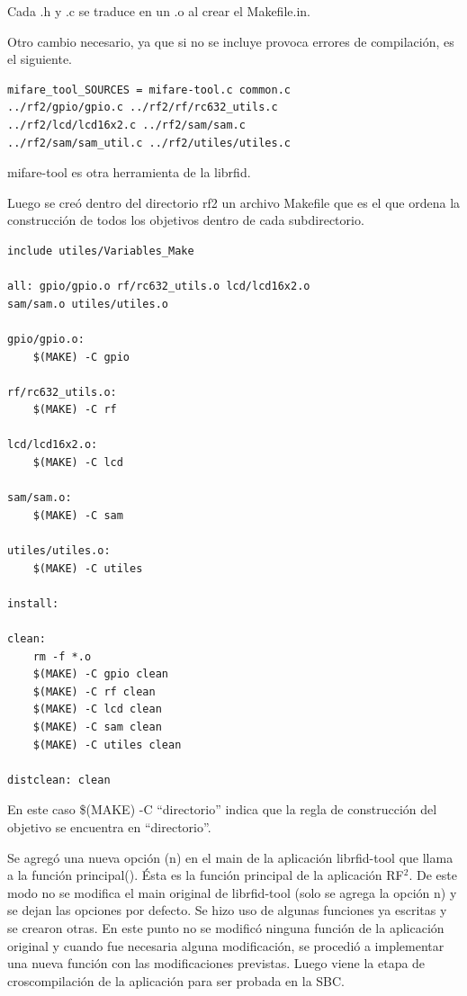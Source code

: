 Cada .h y .c se traduce en un .o al crear el Makefile.in.

\bigskip
Otro cambio necesario, ya que si no se incluye provoca errores de compilación, es el siguiente.

\begin{verbatim}
mifare_tool_SOURCES = mifare-tool.c common.c 
../rf2/gpio/gpio.c ../rf2/rf/rc632_utils.c 
../rf2/lcd/lcd16x2.c ../rf2/sam/sam.c 
../rf2/sam/sam_util.c ../rf2/utiles/utiles.c
\end{verbatim}

mifare-tool es otra herramienta de la librfid.

\bigskip
Luego se creó dentro del directorio rf2 un archivo Makefile que es el que ordena la construcción de todos los objetivos dentro de cada subdirectorio.

\begin{verbatim}
include utiles/Variables_Make 

all: gpio/gpio.o rf/rc632_utils.o lcd/lcd16x2.o 
sam/sam.o utiles/utiles.o 

gpio/gpio.o: 
	$(MAKE) -C gpio 

rf/rc632_utils.o: 
	$(MAKE) -C rf 

lcd/lcd16x2.o: 
	$(MAKE) -C lcd 

sam/sam.o: 
	$(MAKE) -C sam 
	 
utiles/utiles.o: 
	$(MAKE) -C utiles 

install: 

clean: 
	rm -f *.o 
	$(MAKE) -C gpio clean 
	$(MAKE) -C rf clean 
	$(MAKE) -C lcd clean 
	$(MAKE) -C sam clean 
	$(MAKE) -C utiles clean 

distclean: clean
\end{verbatim}

\bigskip
En este caso \$(MAKE) -C “directorio” indica que la regla de construcción del objetivo se encuentra en “directorio”.

\bigskip
Se agregó una nueva opción (n) en el main de la aplicación librfid-tool que llama a la función principal(). Ésta es la función principal de la aplicación RF$^{2}$. De este modo no se modifica el main original de librfid-tool (solo se agrega la opción n) y se dejan las opciones por defecto.
Se hizo uso de algunas funciones ya escritas y se crearon otras. En este punto no se modificó ninguna función de la aplicación original y cuando fue necesaria alguna modificación, se procedió a implementar una nueva función con las modificaciones previstas.
Luego viene la etapa de croscompilación de la aplicación para ser probada en la SBC.

